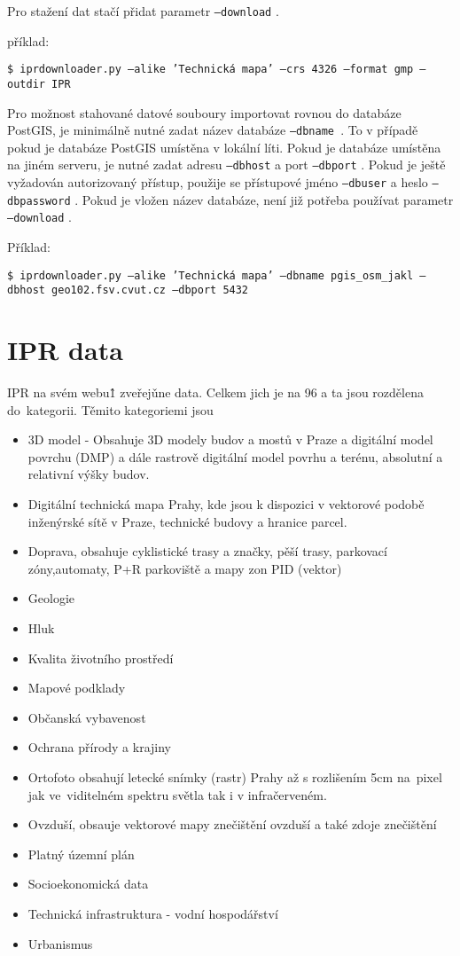 Pro stažení dat stačí přidat parametr {\tt --download} .

příklad:

{\tt \$ iprdownloader.py ---alike 'Technická mapa' ---crs 4326 ---format gmp ---outdir IPR}

Pro možnost stahované datové souboury importovat rovnou do databáze PostGIS, je 
minimálně nutné zadat název databáze {\tt ---dbname }. To v případě pokud je
databáze PostGIS umístěna v lokální líti. Pokud je databáze umístěna na jiném
serveru, je nutné zadat adresu {\tt ---dbhost} a port {\tt ---dbport} . Pokud je
ještě vyžadován autorizovaný přístup, použije se přístupové jméno {\tt ---dbuser} a
heslo {\tt ---dbpassword} . 
Pokud je vložen název databáze, není již potřeba používat parametr {\tt ---download} .

Příklad:

{\tt \$ iprdownloader.py ---alike 'Technická mapa' ---dbname pgis\_osm\_jakl ---dbhost geo102.fsv.cvut.cz  ---dbport 5432 } 
 

\section{IPR data}
\label{IPR data}
IPR na svém webu\^1 zveřejǔne data. Celkem jich je na 96 a ta jsou rozdělena 
do~kategorii. Těmito kategoriemi jsou
 
\begin{itemize} 
    \item   3D model - Obsahuje 3D modely budov a mostů v Praze a digitální 
            model povrchu (DMP) a dále rastrově digitální model povrhu a 
            terénu, absolutní a relativní výšky budov.
    \item   Digitální technická mapa Prahy, kde jsou k dispozici v vektorové
            podobě inženýrské sítě v Praze, technické budovy a hranice parcel.
    \item   Doprava, obsahuje cyklistické trasy a značky, pěší trasy, 
            parkovací zóny,automaty, P+R parkoviště a mapy zon PID (vektor)
    \item   Geologie
    \item   Hluk
    \item   Kvalita životního prostředí
    \item   Mapové podklady
    \item   Občanská vybavenost
    \item   Ochrana přírody a krajiny
    \item   Ortofoto obsahují letecké snímky (rastr) Prahy až s rozlišením 5cm 
            na~pixel jak ve~viditelném spektru světla tak i v infračerveném.
    \item   Ovzduší, obsauje vektorové mapy znečištění ovzduší a také
            zdoje znečištění
    \item   Platný územní plán
    \item   Socioekonomická data
    \item   Technická infrastruktura - vodní hospodářství
    \item   Urbanismus
\end{itemize}



